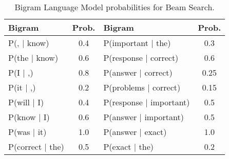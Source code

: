 \documentclass[11pt, letterpaper]{article}
\begin{document}
\begin{table}[h!]
    \centering
    \begin{tabular}{|l|c|l|c|}
    \toprule
        Bigram & Prob. & Bigram & Prob.\\
        \hline
        P(, $|$ know) & 0.4 & P(important $|$ the) & 0.3 \\
        P(the $|$ know) & 0.6 & P(response $|$ correct) & 0.6 \\
        P(I $|$ ,) & 0.8 & P(answer $|$ correct) & 0.25  \\
        P(it $|$ ,) & 0.2 & P(problems $|$ correct) & 0.15  \\
        P(will $|$ I) & 0.4 & P(response $|$ important) & 0.5 \\
        P(know $|$ I) & 0.6 & P(answer $|$ important) & 0.5\\
        P(was $|$ it) & 1.0 & P(answer $|$ exact) & 1.0 \\
        P(correct $|$ the) & 0.5 &  P(exact $|$ the) & 0.2 \\
    \bottomrule
    \end{tabular}
    \caption{Bigram Language Model probabilities for Beam Search.}
    \label{tab:bigram_prob}
\end{table}
\end{document}
